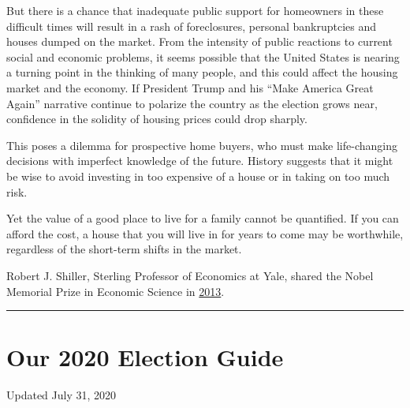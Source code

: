 But there is a chance that inadequate public support for homeowners in
these difficult times will result in a rash of foreclosures, personal
bankruptcies and houses dumped on the market. From the intensity of
public reactions to current social and economic problems, it seems
possible that the United States is nearing a turning point in the
thinking of many people, and this could affect the housing market and
the economy. If President Trump and his ``Make America Great Again''
narrative continue to polarize the country as the election grows near,
confidence in the solidity of housing prices could drop sharply.

This poses a dilemma for prospective home buyers, who must make
life-changing decisions with imperfect knowledge of the future. History
suggests that it might be wise to avoid investing in too expensive of a
house or in taking on too much risk.

Yet the value of a good place to live for a family cannot be quantified.
If you can afford the cost, a house that you will live in for years to
come may be worthwhile, regardless of the short-term shifts in the
market.

Robert J. Shiller, Sterling Professor of Economics at Yale, shared the
Nobel Memorial Prize in Economic Science in
\href{https://www.nytimes.com/2013/10/15/business/3-american-professors-awarded-nobel-in-economic-sciences.html?_r=0}{2013}.

\begin{center}\rule{0.5\linewidth}{\linethickness}\end{center}

\hypertarget{our-2020-election-guide}{%
\section{Our 2020 Election Guide}\label{our-2020-election-guide}}

Updated July 31, 2020

